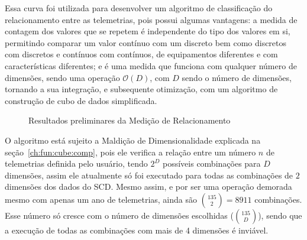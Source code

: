 Essa curva foi utilizada para desenvolver um algoritmo de classificação do relacionamento entre as telemetrias, pois possui algumas vantagens: a medida de contagem dos valores que se repetem é independente do tipo dos valores em si, permitindo comparar um valor contínuo com um discreto bem como discretos com discretos e contínuos com contínuos, de equipamentos diferentes e com características diferentes; e é uma medida que funciona com qualquer número de dimensões, sendo uma operação $\mathcal{O}(D)$, com $D$ sendo o número de dimensões, tornando a sua integração, e subsequente otimização, com um algoritmo de construção de cubo de dados simplificada.

\begin{figure}[ht]
	\caption{Resultados preliminares da Medição de Relacionamento}
	\vspace{6mm}
	\begin{center}
	\end{center}
	\vspace{4mm}
	\label{fig:similarityresults}
\end{figure}

O algoritmo está sujeito a Maldição de Dimensionalidade explicada na seção~\ref{ch:fun:cube:comp}, pois ele verifica a relação entre um número $n$ de telemetrias definida pelo usuário, tendo $2^D$ possíveis combinações para $D$ dimensões, assim ele atualmente só foi executado para todas as combinações de $2$ dimensões dos dados do SCD.
{\color{cerulean}
Mesmo assim, e por ser uma operação demorada mesmo com apenas um ano de telemetrias, ainda são ${135 \choose 2} = 8911$ combinações.
}
Esse número só cresce com o número de dimensões escolhidas (${135 \choose D}$), sendo que a execução de todas as combinações com mais de 4 dimensões é inviável.

